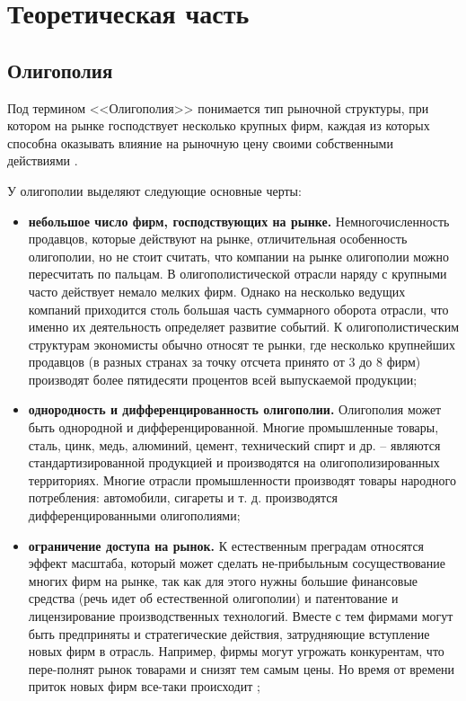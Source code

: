\chapter{Теоретическая часть}

\section{Олигополия}

Под термином <<Олигополия>> понимается тип рыночной структуры, при котором на рынке господствует несколько крупных фирм, каждая из которых способна оказывать влияние на рыночную цену своими собственными действиями \cite{info_oly3}. 

У олигополии выделяют следующие основные черты:

\begin{itemize}
	\item \textbf{небольшое число фирм, господствующих на рынке.} Немногочисленность продавцов, которые действуют на рынке, отличительная особенность олигополии, но не стоит считать, что компании на рынке олигополии можно пересчитать по пальцам. В олигополистической отрасли наряду с крупными часто действует немало мелких фирм. Однако на несколько ведущих компаний приходится столь большая часть суммарного оборота отрасли, что именно их деятельность определяет развитие событий. К олигополистическим структурам экономисты обычно относят те рынки, где несколько крупнейших продавцов (в разных странах за точку отсчета принято от 3 до 8 фирм) производят более пятидесяти процентов всей выпускаемой продукции;
	
	\item \textbf{однородность и дифференцированность олигополии.} Олигополия может быть однородной и дифференцированной. Многие промышленные товары, сталь, цинк, медь, алюминий, цемент, технический спирт и др. -- являются стандартизированной продукцией и производятся на олигополизированных территориях. Многие отрасли промышленности производят товары народного потребления: автомобили, сигареты и т. д. производятся дифференцированными олигополиями;
	
	\item \textbf{ограничение доступа на рынок.} К естественным преградам относятся эффект масштаба, который может сделать не-прибыльным сосуществование многих фирм на рынке, так как для этого нужны большие финансовые средства (речь идет об естественной олигополии) и патентование и лицензирование производственных технологий. Вместе с тем фирмами могут быть предприняты и стратегические действия, затрудняющие вступление новых фирм в отрасль. Например, фирмы могут угрожать конкурентам, что пере-полнят рынок товарами и снизят тем самым цены. Но время от времени приток новых фирм все-таки происходит \cite{info_oly3};
		

\end{itemize}
